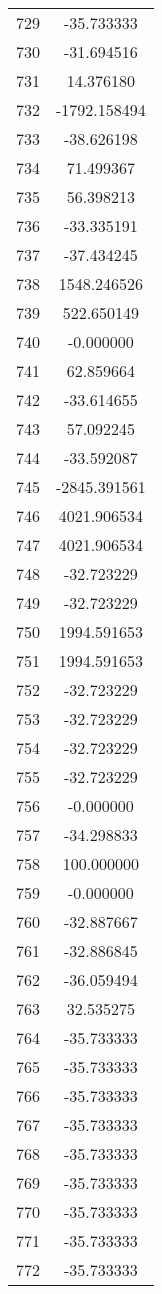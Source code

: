 \documentclass[12pt]{article}
\begin{document}
\begin{longtable}{@{}cc@{}}
729 & -35.733333 \\
730 & -31.694516 \\
731 & 14.376180 \\
732 & -1792.158494 \\
733 & -38.626198 \\
734 & 71.499367 \\
735 & 56.398213 \\
736 & -33.335191 \\
737 & -37.434245 \\
738 & 1548.246526 \\
739 & 522.650149 \\
740 & -0.000000 \\
741 & 62.859664 \\
742 & -33.614655 \\
743 & 57.092245 \\
744 & -33.592087 \\
745 & -2845.391561 \\
746 & 4021.906534 \\
747 & 4021.906534 \\
748 & -32.723229 \\
749 & -32.723229 \\
750 & 1994.591653 \\
751 & 1994.591653 \\
752 & -32.723229 \\
753 & -32.723229 \\
754 & -32.723229 \\
755 & -32.723229 \\
756 & -0.000000 \\
757 & -34.298833 \\
758 & 100.000000 \\
759 & -0.000000 \\
760 & -32.887667 \\
761 & -32.886845 \\
762 & -36.059494 \\
763 & 32.535275 \\
764 & -35.733333 \\
765 & -35.733333 \\
766 & -35.733333 \\
767 & -35.733333 \\
768 & -35.733333 \\
769 & -35.733333 \\
770 & -35.733333 \\
771 & -35.733333 \\
772 & -35.733333 \\

\end{longtable}
\end{document}
